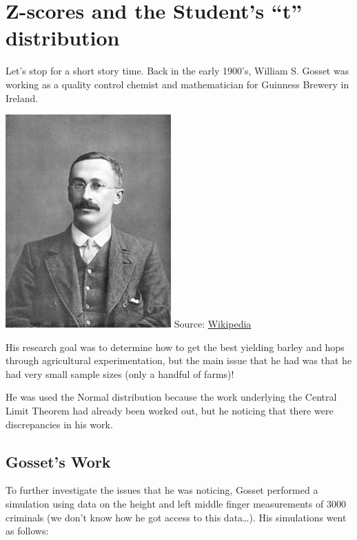 \documentclass[]{book}
\begin{document}
\hypertarget{z-scores-and-the-students-t-distribution}{%
\section{Z-scores and the Student's ``t'' distribution}\label{z-scores-and-the-students-t-distribution}}

Let's stop for a short story time. Back in the early 1900's, William S. Gosset was working as a quality control chemist and mathematician for Guinness Brewery in Ireland.

\includegraphics{Photos/gosset.jpg}
Source: \href{http://upload.wikimedia.org/wikipedia/commons/thumb/4/42/William_Sealy_Gosset.jpg/240px-William_Sealy_Gosset.jpg}{Wikipedia}

His research goal was to determine how to get the best yielding barley and hops through agricultural experimentation, but the main issue that he had was that he had very small sample sizes (only a handful of farms)!

He was used the Normal distribution because the work underlying the Central Limit Theorem had already been worked out, but he noticing that there were discrepancies in his work.

\hypertarget{gossets-work}{%
\subsection{Gosset's Work}\label{gossets-work}}

To further investigate the issues that he was noticing, Gosset performed a simulation using data on the height and left middle finger measurements of 3000 criminals (we don't know how he got access to this data\ldots{}). His simulations went as follows:
\end{document}
